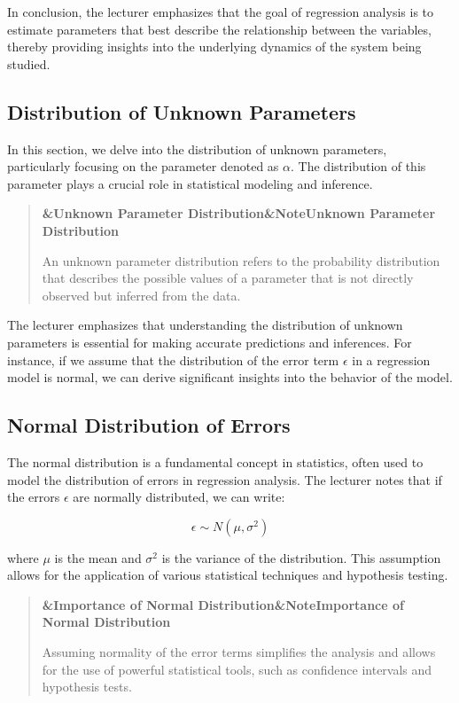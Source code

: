 \documentclass[a4paper]{article}
\providecommand{\mathcal}[1]{\mathit{#1}}
\newcommand{\boxheading}[1]{%
  \par\smallskip
  \noindent\textbf{\ifx&#1&Note\else#1\fi}\par
  \smallskip
}
\newenvironment{defbox}[1][]{%
  \begin{quote}\color{green!40!black}\boxheading{#1}\normalcolor
}{\end{quote}}
\newenvironment{rembox}[1][]{%
  \begin{quote}\color{black!70}\boxheading{#1}\normalcolor
}{\end{quote}}
\begin{document}
In conclusion, the lecturer emphasizes that the goal of regression analysis is to estimate parameters that best describe the relationship between the variables, thereby providing insights into the underlying dynamics of the system being studied.

\subsection{Distribution of Unknown Parameters}
In this section, we delve into the distribution of unknown parameters, particularly focusing on the parameter denoted as \( \alpha \). The distribution of this parameter plays a crucial role in statistical modeling and inference.

\begin{defbox}[Unknown Parameter Distribution]
An unknown parameter distribution refers to the probability distribution that describes the possible values of a parameter that is not directly observed but inferred from the data.
\end{defbox}

The lecturer emphasizes that understanding the distribution of unknown parameters is essential for making accurate predictions and inferences. For instance, if we assume that the distribution of the error term \( \epsilon \) in a regression model is normal, we can derive significant insights into the behavior of the model.

\subsection{Normal Distribution of Errors}
The normal distribution is a fundamental concept in statistics, often used to model the distribution of errors in regression analysis. The lecturer notes that if the errors \( \epsilon \) are normally distributed, we can write:

\begin{equation}\label{eq:normal_distribution}
\epsilon \sim \mathcal{N}(\mu, \sigma^2)
\end{equation}

where \( \mu \) is the mean and \( \sigma^2 \) is the variance of the distribution. This assumption allows for the application of various statistical techniques and hypothesis testing.

\begin{rembox}[Importance of Normal Distribution]
Assuming normality of the error terms simplifies the analysis and allows for the use of powerful statistical tools, such as confidence intervals and hypothesis tests.
\end{rembox}
\end{document}
